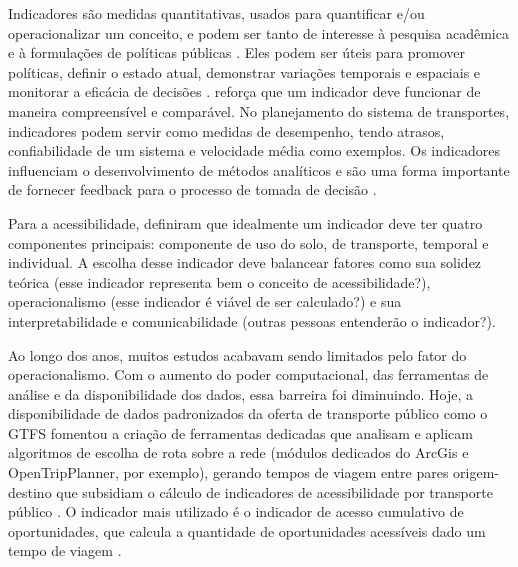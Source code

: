 \documentclass[        
    a4paper,          %
    12pt,             %
    chapter=TITLE,    %
    section=Title,    %
    subsection=Title, %
    oneside,          %
    english,          %
    spanish,          %
    brazil,           %
    fleqn             %
]{abntex2}
\begin{document}
  Indicadores são medidas quantitativas, usados para quantificar e/ou operacionalizar um conceito, e podem ser tanto de interesse à pesquisa acadêmica e à formulações de políticas públicas \citep{Jannuzi2003}. Eles podem ser úteis para promover políticas, definir o estado atual, demonstrar variações temporais e espaciais e monitorar a eficácia de decisões \citep{Wills1995}. \citet{Fiori2006} reforça que um indicador deve funcionar de maneira compreensível e comparável. No planejamento do sistema de transportes, indicadores podem servir como medidas de desempenho, tendo atrasos, confiabilidade de um sistema e velocidade média como exemplos. Os indicadores influenciam o desenvolvimento de métodos analíticos e são uma forma importante de fornecer feedback para o processo de tomada de decisão \citep{Meyer2003}.
  
  Para a acessibilidade, \citet{Geurs2004} definiram que idealmente um indicador deve ter quatro componentes principais: componente de uso do solo, de transporte, temporal e individual. A escolha desse indicador deve balancear fatores como sua solidez teórica (esse indicador representa bem o conceito de acessibilidade?), operacionalismo (esse indicador é viável de ser calculado?) e sua interpretabilidade e comunicabilidade (outras pessoas entenderão o indicador?).
  
  Ao longo dos anos, muitos estudos acabavam sendo limitados pelo fator do operacionalismo. Com o aumento do poder computacional, das ferramentas de análise e da disponibilidade dos dados, essa barreira foi diminuindo. Hoje, a disponibilidade de dados padronizados da oferta de transporte público como o GTFS fomentou a criação de ferramentas dedicadas que analisam e aplicam algoritmos de escolha de rota sobre a rede (módulos dedicados do ArcGis e OpenTripPlanner, por exemplo), gerando tempos de viagem entre pares origem-destino que subsidiam o cálculo de indicadores de acessibilidade por transporte público \citep{Owen2015, Mayaud2018, El-Geneidy2016a}. O indicador mais utilizado é o indicador de acesso cumulativo de oportunidades, que calcula a quantidade de oportunidades acessíveis dado um tempo de viagem \citep{Pereira2019}.
  
\end{document}

